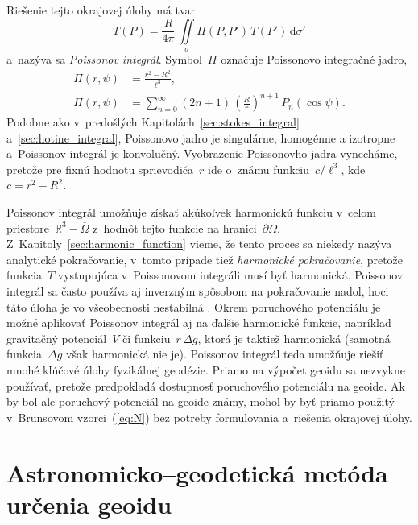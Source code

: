 \documentclass[a4paper,12pt]{book}
\newcommand{\diff}{\mathrm d}
\begin{document}
Riešenie tejto okrajovej úlohy \parencite[pre odvodenie pozri 
napríklad][]{MoritzPhysicalGeodesy,SansoGeoidDetermination} má tvar
%
\begin{equation}
\label{eq:poisson}
T(P) = \frac{R}{4\pi} \, \iint\limits_\sigma \Pi(P, P') \, T(P') \, 
\diff\sigma'
\end{equation}
%
a~nazýva sa \emph{Poissonov integrál}.  Symbol~$\Pi$ označuje Poissonovo 
integračné jadro,
%
\begin{align}
\Pi(r, \psi) &= \frac{r^2 - R^2}{\ell^3}{,}\label{eq:poisson_kernel}\\
\Pi(r, \psi) &= \sum_{n = 0}^{\infty} (2n + 1) \, \left( \frac{R}{r} \right)^{n 
+ 1} \, P_n(\cos\psi)\label{eq:poisson_kernel_spectral}{.}
\end{align}
%
Podobne ako v~predošlých Kapitolách~\ref{sec:stokes_integral} 
a~\ref{sec:hotine_integral}, Poissonovo jadro je singulárne, homogénne 
a izotropne a~Poissonov integrál je konvolučný.  Vyobrazenie Poissonovho jadra 
vynecháme, pretože pre fixnú hodnotu sprievodiča~$r$ ide o~známu funkciu~$c 
\slash \ell^3$, kde $c = r^2 - R^2$.

Poissonov integrál umožňuje získať akúkoľvek harmonickú funkciu v~celom 
priestore~$\mathbb{R}^3 - \overline\Omega$ z~hodnôt tejto funkcie na 
hranici~$\partial\Omega$.  Z~Kapitoly~\ref{sec:harmonic_function} vieme, že 
tento proces sa niekedy nazýva analytické pokračovanie, v~tomto prípade tiež 
\emph{harmonické pokračovanie}, pretože funkcia~$T$ vystupujúca v~Poissonovom 
integráli musí byť harmonická.  Poissonov integrál sa často používa aj 
inverzným spôsobom na pokračovanie nadol, hoci táto úloha je vo všeobecnosti 
nestabilná \parencite{SansoGeodeticBoundaryValueProblem}.  Okrem poruchového 
potenciálu je možné aplikovať Poissonov integrál aj na ďalšie harmonické 
funkcie, napríklad gravitačný potenciál~$V$ či funkciu~$r \, \Delta g$, ktorá 
je taktiež harmonická (samotná funkcia~$\Delta g$ však harmonická nie je).  
Poissonov integrál teda umožňuje riešiť mnohé kľúčové úlohy fyzikálnej 
geodézie.  Priamo na výpočet geoidu sa nezvykne používať, pretože predpokladá 
dostupnosť poruchového potenciálu na geoide.  Ak by bol ale poruchový potenciál 
na geoide známy, mohol by byť priamo použitý v~Brunsovom vzorci~(\ref{eq:N}) 
bez potreby formulovania a~riešenia okrajovej úlohy.




\section{Astronomicko--geodetická metóda určenia geoidu}
\label{sec:geoid_astrogeodetic}
\end{document}
